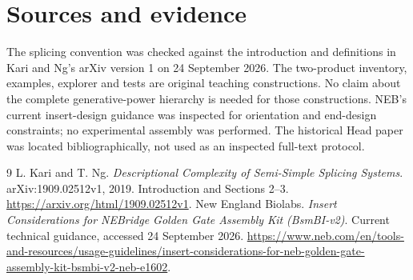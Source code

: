 \section*{Sources and evidence}
The splicing convention was checked against the introduction and definitions in
Kari and Ng's arXiv version 1 on 24 September 2026. The two-product inventory,
examples, explorer and tests are original teaching constructions. No claim about
the complete generative-power hierarchy is needed for those constructions.
NEB's current insert-design guidance was inspected for orientation and end-design
constraints; no experimental assembly was performed. The historical Head paper
was located bibliographically, not used as an inspected full-text protocol.
\begingroup\let\chapter\section
\begin{thebibliography}{9}
 L. Kari and T. Ng.
\emph{Descriptional Complexity of Semi-Simple Splicing Systems}.
arXiv:1909.02512v1, 2019. Introduction and Sections 2--3.
\url{https://arxiv.org/html/1909.02512v1}.
 New England Biolabs.
\emph{Insert Considerations for NEBridge Golden Gate Assembly Kit (BsmBI-v2)}.
Current technical guidance, accessed 24 September 2026.
\url{https://www.neb.com/en/tools-and-resources/usage-guidelines/insert-considerations-for-neb-golden-gate-assembly-kit-bsmbi-v2-neb-e1602}.
\end{thebibliography}\endgroup
